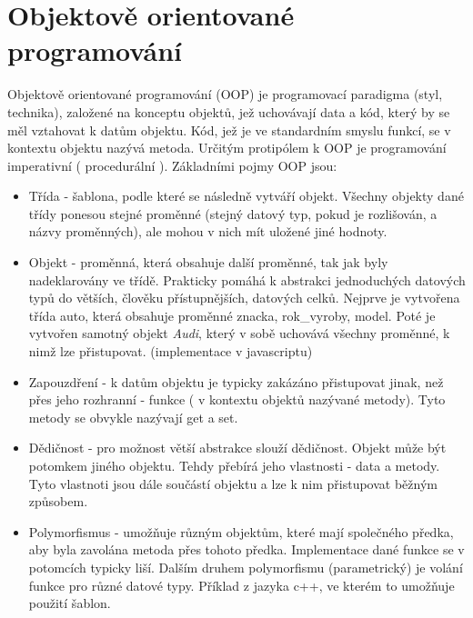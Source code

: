 \documentclass[main.tex]{subfiles}
\begin{document}
\section{Objektově orientované programování}
\label{oop}
Objektově orientované programování (OOP) je programovací paradigma (styl, technika), založené na konceptu objektů, jež uchovávají data a kód, který by se měl vztahovat k datům objektu. Kód, jež je ve standardním smyslu funkcí, se v kontextu objektu nazývá metoda. Určitým protipólem k OOP je programování imperativní ( procedurální ). Základními pojmy OOP jsou:
\begin{itemize}
    \item Třída - šablona, podle které se následně vytváří objekt. Všechny objekty dané třídy ponesou stejné proměnné (stejný datový typ, pokud je rozlišován, a názvy proměnných), ale mohou v nich mít uložené jiné hodnoty. 
	\item Objekt - proměnná, která obsahuje další proměnné, tak jak byly nadeklarovány ve třídě. Prakticky pomáhá k abstrakci jednoduchých datových typů do větších, člověku přístupnějších, datových celků.
		Nejprve je vytvořena třída auto, která obsahuje proměnné znacka, rok\_vyroby, model. Poté je vytvořen samotný objekt \textit{Audi}, který v sobě uchovává všechny proměnné, k nimž lze přistupovat. (implementace v javascriptu)
    \item Zapouzdření - k datům objektu je typicky zakázáno přistupovat jinak, než přes jeho rozhranní - funkce ( v kontextu objektů nazývané metody). Tyto metody se obvykle nazývají get a set.
	\item Dědičnost - pro možnost větší abstrakce slouží dědičnost. Objekt může být potomkem jiného objektu. Tehdy přebírá jeho vlastnosti - data a metody. Tyto vlastnoti jsou dále součástí objektu a lze k nim přistupovat běžným způsobem.
	\item Polymorfismus - umožňuje různým objektům, které mají společného předka, aby byla zavolána metoda přes tohoto předka. Implementace dané funkce se v potomcích typicky liší.
		Dalším druhem polymorfismu (parametrický) je volání funkce pro různé datové typy. Příklad z jazyka c++, ve kterém to umožňuje použití šablon.
\end{itemize}
\end{document}
